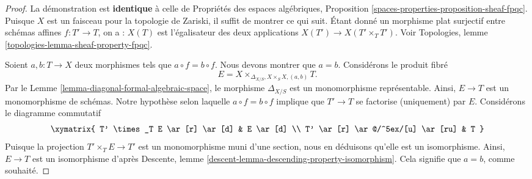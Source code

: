 \begin{proof}
La démonstration est {\bf identique} à celle de
Propriétés des espaces algébriques, Proposition
\ref{spaces-properties-proposition-sheaf-fpqc}.
Puisque $X$ est un faisceau pour la topologie de Zariski, il
suffit de montrer ce qui suit. Étant donné un morphisme plat surjectif
entre schémas affines $f : T' \to T$, on a :
$X(T)$ est l'égalisateur des deux applications $X(T') \to X(T' \times_T T')$.
Voir Topologies, lemme \ref{topologies-lemma-sheaf-property-fpqc}.

\medskip\noindent
Soient $a, b : T \to X$ deux morphismes tels que $a \circ f = b \circ f$.
Nous devons montrer que $a = b$. Considérons le produit fibré
$$
E = X \times_{\Delta_{X/S}, X \times_S X, (a, b)} T.
$$
Par le Lemme \ref{lemma-diagonal-formal-algebraic-space},
le morphisme $\Delta_{X/S}$ est un monomorphisme représentable. Ainsi,
$E \to T$ est un monomorphisme de schémas. Notre hypothèse selon laquelle
$a \circ f = b \circ f$ implique que $T' \to T$ se factorise (uniquement) par $E$.
Considérons le diagramme commutatif
$$
\xymatrix{
T' \times_T E \ar[r] \ar[d] & E \ar[d] \\
T' \ar[r] \ar@/^5ex/[u] \ar[ru] & T
}
$$
Puisque la projection $T' \times_T E \to T'$ est un monomorphisme
muni d'une section, nous en déduisons qu'elle est un isomorphisme. Ainsi,
$E \to T$ est un isomorphisme d'après
Descente, lemme \ref{descent-lemma-descending-property-isomorphism}.
Cela signifie que $a = b$, comme souhaité.


\end{proof}
